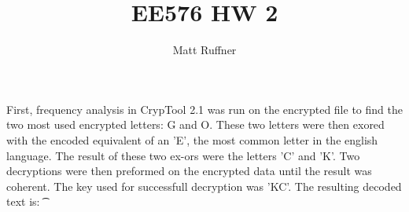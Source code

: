 \documentclass[letterpaper]{article}
\title{EE576 HW 2}
\author{Matt Ruffner}
\begin{document}
\maketitle

\section{}
First, frequency analysis in CrypTool 2.1 was run on the encrypted file to find the two most used encrypted letters: G and O. These two letters were then exored with the encoded equivalent of an 'E', the most common letter in the english language. The result of these two ex-ors were the letters 'C' and 'K'. Two decryptions were then preformed on the encrypted data until the result was coherent. The key used for successfull decryption was 'KC'. The resulting decoded text is: 
\t
\end{document}
